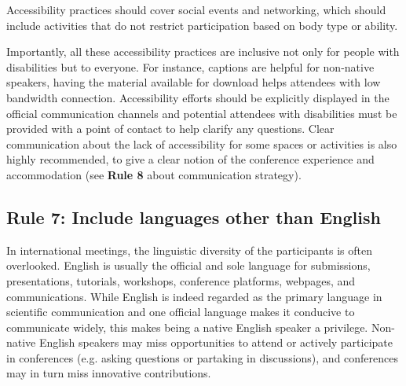 \documentclass[10pt,letterpaper]{article}
\begin{document}
Accessibility practices should cover social events and networking, which should include activities that do not restrict participation based on body type or ability. 

Importantly, all these accessibility practices are inclusive not only for people with disabilities but to everyone.
For instance, captions are helpful for non-native speakers, having the material available for download helps attendees with low bandwidth connection. Accessibility efforts should be explicitly displayed in the official communication channels and potential attendees with disabilities must be provided with a point of contact to help clarify any questions.
Clear communication about the lack of accessibility for some spaces or activities is also highly recommended, to give a clear notion of the conference experience and accommodation (see \textbf{Rule 8} about communication strategy).

\subsection*{Rule 7: Include languages other than English}
\label{rule_language}

In international meetings, the linguistic diversity of the participants is often overlooked. 
English is usually the official and sole language for submissions, presentations, tutorials, workshops, conference platforms, webpages, and communications. 
While English is indeed regarded as the primary language in scientific communication and one official language makes it conducive to communicate widely, this makes being a native English speaker a privilege.%
Non-native English speakers may miss opportunities to attend or actively participate in conferences (e.g. asking questions or partaking in discussions),
and conferences may in turn miss innovative contributions.
\end{document}
